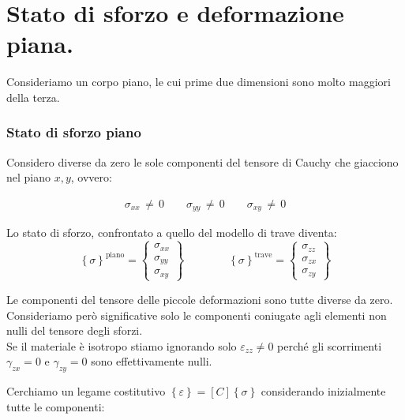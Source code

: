 \section{Stato di sforzo e deformazione piana.}

Consideriamo un corpo piano, le cui prime due dimensioni sono molto maggiori della terza.
\subsubsection*{Stato di sforzo piano}
Considero diverse da zero le sole componenti del tensore di Cauchy che giacciono nel piano $x,y$, ovvero:

\begin{align*}
         \sigma_{xx}\,\neq\,0\qquad\sigma_{yy}\,\neq\,0\qquad\sigma_{xy}\,\neq\,0
    \end{align*}


Lo stato di sforzo, confrontato a quello del modello di trave diventa:
    \begin{equation*}
     \left\{\sigma\right\}^{\text{piano}} = \left\{
    \begin{array}{c}
    \sigma_{xx} \\ \sigma_{yy} \\ \sigma_{xy}
    \end{array}
    \right\}
    \quad\quad\quad\quad
    \left\{\sigma\right\}^{\text{trave}} = \left\{
    \begin{array}{c}
    \sigma_{zz} \\ \sigma_{zx} \\ \sigma_{zy}
    \end{array}
    \right\}
 \end{equation*}

 Le componenti del tensore delle piccole deformazioni sono tutte diverse da zero. Consideriamo però significative solo le componenti coniugate agli elementi non nulli del tensore degli sforzi.\\ Se il materiale è isotropo stiamo ignorando solo $\varepsilon_{zz}\neq0$ perché gli scorrimenti $\gamma_{zx}=0$ e $\gamma_{zy}=0$ sono effettivamente nulli.

 Cerchiamo un legame costitutivo $\left\{\varepsilon\right\}=[C]\left\{\sigma\right\}$ considerando inizialmente tutte le componenti:

